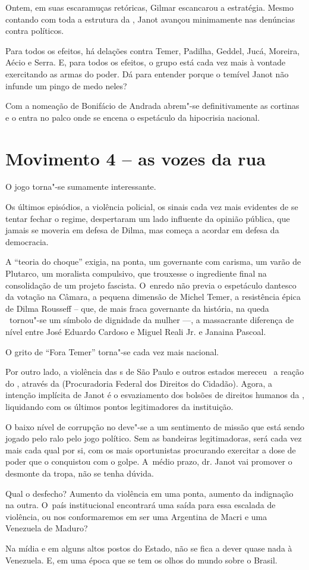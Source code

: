 Ontem, em suas escaramuças retóricas, Gilmar escancarou a estratégia.
Mesmo contando com toda a estrutura da , Janot avançou minimamente
nas denúncias contra políticos.

Para todos os efeitos, há delações contra Temer, Padilha, Geddel, Jucá,
Moreira, Aécio e Serra. E, para todos os efeitos, o grupo está cada vez
mais à vontade exercitando as armas do poder. Dá para entender porque o
temível Janot não infunde um pingo de medo neles?

Com a nomeação de Bonifácio de Andrada abrem"-se definitivamente as
cortinas e o  entra no palco onde se encena o espetáculo da
hipocrisia nacional.

\section{Movimento 4 -- as vozes da rua}

O jogo torna"-se sumamente interessante.

Os últimos episódios, a violência policial, os sinais cada vez mais
evidentes de se tentar fechar o regime, despertaram um lado influente da
opinião pública, que jamais se moveria em defesa de Dilma, mas começa a
acordar em defesa da democracia.

A ``teoria do choque'' exigia, na ponta, um governante com carisma, um
varão de Plutarco, um moralista compulsivo, que trouxesse o ingrediente
final na consolidação de um projeto fascista. O~enredo não previa o
espetáculo dantesco da votação na Câmara, a pequena dimensão de Michel
Temer, a resistência épica de Dilma Rousseff -- que, de mais fraca
governante da história, na queda ~tornou"-se um símbolo de dignidade da
mulher \mbox{---,} a massacrante diferença de nível entre José Eduardo Cardoso
e Miguel Reali Jr. e Janaina Pascoal.

O grito de ``Fora Temer'' torna"-se cada vez mais nacional.

Por outro lado, a violência das s de São Paulo e outros estados
mereceu ~a reação do , através da  (Procuradoria Federal dos
Direitos do Cidadão). Agora, a intenção implícita de Janot é o
esvaziamento dos bolsões de direitos humanos da , liquidando com os
últimos pontos legitimadores da instituição.

O baixo nível de corrupção no  deve"-se a um sentimento de missão que
está sendo jogado pelo ralo pelo jogo político. Sem as bandeiras
legitimadoras, será cada vez mais cada qual por si, com os mais
oportunistas procurando exercitar a dose de poder que o  conquistou
com o golpe. A~médio prazo, dr. Janot vai promover o desmonte da tropa,
não se tenha dúvida.

Qual o desfecho? Aumento da violência em uma ponta, aumento da
indignação na outra. O~país institucional encontrará uma saída para essa
escalada de violência, ou nos conformaremos em ser uma Argentina de
Macri e uma Venezuela de Maduro?

Na mídia e em alguns altos postos do Estado, não se fica a dever quase
nada à Venezuela. E, em uma época que se tem os olhos do mundo sobre o
Brasil.
